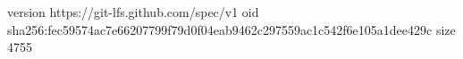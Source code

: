 version https://git-lfs.github.com/spec/v1
oid sha256:fec59574ac7e66207799f79d0f04eab9462c297559ac1c542f6e105a1dee429c
size 4755
